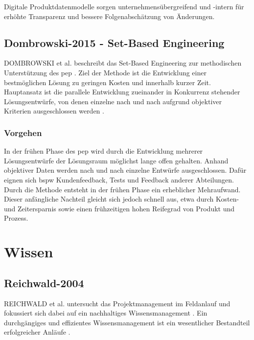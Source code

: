 Digitale Produktdatenmodelle sorgen unternehmensübergreifend und -intern für erhöhte Transparenz und bessere Folgenabschätzung von Änderungen. 


\subsection*{Dombrowski-2015 - Set-Based Engineering}

DOMBROWSKI et al. beschreibt das Set-Based Engineering zur methodischen Unterstützung des \gls{pep} \autocite{Dombrowski2015}. %
Ziel der Methode ist die Entwicklung einer bestmöglichen Lösung zu geringen Kosten und innerhalb kurzer Zeit. 
Hauptansatz ist die parallele Entwicklung zueinander in Konkurrenz stehender Lösungsentwürfe, von denen einzelne nach und nach aufgrund objektiver Kriterien ausgeschlossen werden \autocite{Schuh2007}.

\subsubsection*{Vorgehen}
In der frühen Phase des \gls{pep} wird durch die Entwicklung mehrerer Lösungsentwürfe der Lösungsraum möglichst lange offen gehalten. Anhand objektiver Daten werden nach und nach einzelne Entwürfe ausgeschlossen. Dafür eignen sich \gls{bspw} Kundenfeedback, Tests und Feedback anderer Abteilungen. 
Durch die Methode entsteht in der frühen Phase ein erheblicher Mehraufwand. Dieser anfängliche Nachteil gleicht sich jedoch schnell aus, etwa durch Kosten- und Zeitersparnis sowie einen frühzeitigen hohen Reifegrad von Produkt und Prozess. 

\section{Wissen}
\subsection*{Reichwald-2004}
REICHWALD et al. untersucht das Projektmanagement im Feldanlauf und fokussiert sich dabei auf ein nachhaltiges Wissensmanagement \autocite{Reichwald2004}. Ein durchgängiges und effizientes Wissensmanagement ist ein wesentlicher Bestandteil erfolgreicher Anläufe \autocite{Kuhn2002}. 

